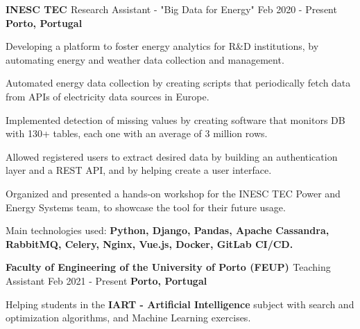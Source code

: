

\begin{cventries}

  \cventry
    {\textbf{INESC TEC \href{https://www.inesctec.pt/en}{\faExternalLink}}} %
    {Research Assistant - "Big Data for Energy"} %
    {Feb 2020 - Present} %
    {\textbf{Porto, Portugal}} %
    {
      \begin{cvitems} %
        \item {Developing a platform to foster energy analytics for R\&D institutions, by automating energy and weather data collection and management.}
        \item {Automated energy data collection by creating scripts that periodically fetch data from APIs of electricity data sources in Europe.}
        \item {Implemented detection of missing values by creating software that monitors DB with 130+ tables, each one with an average of 3 million rows.}
        \item {Allowed registered users to extract desired data by building an authentication layer and a REST API, and by helping create a user interface.}
        \item {Organized and presented a hands-on workshop for the INESC TEC Power and Energy Systems team, to showcase the tool for their future usage.}
        \item {Main technologies used: \textbf{Python, Django, Pandas, Apache Cassandra, RabbitMQ, Celery, Nginx, Vue.js, Docker, GitLab CI/CD.}}
      \end{cvitems}
    }

  \cventry
     {\textbf{Faculty of Engineering of the University of Porto (FEUP) \href{https://sigarra.up.pt/feup/pt/web_page.inicial}{\faExternalLink}}} %
    {Teaching Assistant} %
    {Feb 2021 - Present} %
    {\textbf{Porto, Portugal}} %
    {
      \begin{cvitems} %
        \item {Helping students in the \textbf{IART - Artificial Intelligence} subject with search and optimization algorithms, and Machine Learning exercises.}
      \end{cvitems}
    }


\end{cventries}
